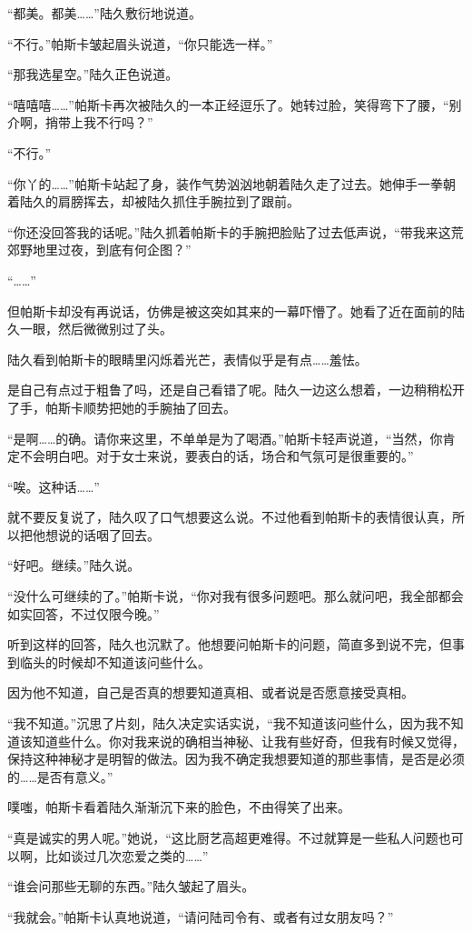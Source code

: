 “都美。都美……”陆久敷衍地说道。

“不行。”帕斯卡皱起眉头说道，“你只能选一样。”

“那我选星空。”陆久正色说道。

“嘻嘻嘻……”帕斯卡再次被陆久的一本正经逗乐了。她转过脸，笑得弯下了腰，“别介啊，捎带上我不行吗？”

“不行。”

“你丫的……”帕斯卡站起了身，装作气势汹汹地朝着陆久走了过去。她伸手一拳朝着陆久的肩膀挥去，却被陆久抓住手腕拉到了跟前。

“你还没回答我的话呢。”陆久抓着帕斯卡的手腕把脸贴了过去低声说，“带我来这荒郊野地里过夜，到底有何企图？”

“……”

但帕斯卡却没有再说话，仿佛是被这突如其来的一幕吓懵了。她看了近在面前的陆久一眼，然后微微别过了头。

陆久看到帕斯卡的眼睛里闪烁着光芒，表情似乎是有点……羞怯。

是自己有点过于粗鲁了吗，还是自己看错了呢。陆久一边这么想着，一边稍稍松开了手，帕斯卡顺势把她的手腕抽了回去。

“是啊……的确。请你来这里，不单单是为了喝酒。”帕斯卡轻声说道，“当然，你肯定不会明白吧。对于女士来说，要表白的话，场合和气氛可是很重要的。”

“唉。这种话……”

就不要反复说了，陆久叹了口气想要这么说。不过他看到帕斯卡的表情很认真，所以把他想说的话咽了回去。

“好吧。继续。”陆久说。

“没什么可继续的了。”帕斯卡说，“你对我有很多问题吧。那么就问吧，我全部都会如实回答，不过仅限今晚。”

听到这样的回答，陆久也沉默了。他想要问帕斯卡的问题，简直多到说不完，但事到临头的时候却不知道该问些什么。

因为他不知道，自己是否真的想要知道真相、或者说是否愿意接受真相。

“我不知道。”沉思了片刻，陆久决定实话实说，“我不知道该问些什么，因为我不知道该知道些什么。你对我来说的确相当神秘、让我有些好奇，但我有时候又觉得，保持这种神秘才是明智的做法。因为我不确定我想要知道的那些事情，是否是必须的……是否有意义。”

噗嗤，帕斯卡看着陆久渐渐沉下来的脸色，不由得笑了出来。

“真是诚实的男人呢。”她说，“这比厨艺高超更难得。不过就算是一些私人问题也可以啊，比如谈过几次恋爱之类的……”

“谁会问那些无聊的东西。”陆久皱起了眉头。

“我就会。”帕斯卡认真地说道，“请问陆司令有、或者有过女朋友吗？”

